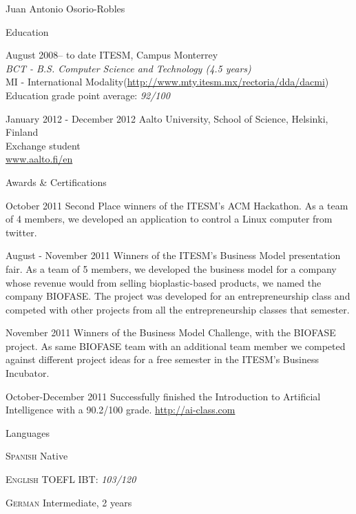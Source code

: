 \documentclass[spanish,10pt,letterpaper]{article}
\begin{document}
\begin{cv}{Juan Antonio Osorio-Robles}
	\begin{cvlist}{Education}
		\item	[August 2008-- to date]
			ITESM, Campus Monterrey
			\\
			\emph{BCT - B.S. Computer Science and Technology (4.5 years)}
			\\
			MI - International Modality(\href{http://www.mty.itesm.mx/rectoria/dda/dacmi}{http://www.mty.itesm.mx/rectoria/dda/dacmi})
			\\
			Education grade point average: \emph{92/100}
		\item [January 2012 - December 2012]
			Aalto University, School of Science, Helsinki, Finland
			\\
			Exchange student
			\\
			\href{www.aalto.fi/en}{www.aalto.fi/en}
	\end{cvlist}

	\begin{cvlist}{Awards \& Certifications}
		\item [October 2011] Second Place winners of the ITESM's ACM Hackathon. As a team of 4 members, we developed an application to control a Linux computer from twitter.
		\item [August - November 2011] Winners of the ITESM's Business Model presentation fair. As a team of 5 members, we developed the business model for a company whose revenue would from selling bioplastic-based products, we named the company BIOFASE. The project was developed for an entrepreneurship class and competed with other projects from all the entrepreneurship classes that semester.
		\item [November 2011] Winners of the Business Model Challenge, with the BIOFASE project. As same BIOFASE team with an additional team member we competed against different project ideas for a free semester in the ITESM's Business Incubator.
		\item [October-December 2011] Successfully finished the Introduction to Artificial Intelligence with a 90.2/100 grade. \href{http://ai-class.com}{http://ai-class.com}
	\end{cvlist}


	\begin{cvlist}{Languages}
		\item [\textsc {Spanish}]
				Native
		\item [\textsc {English}]
				TOEFL IBT: \emph{103/120}
		\item [\textsc {German}]
				Intermediate, 2 years
		\end{cvlist}


\end{cv}
\end{document}
